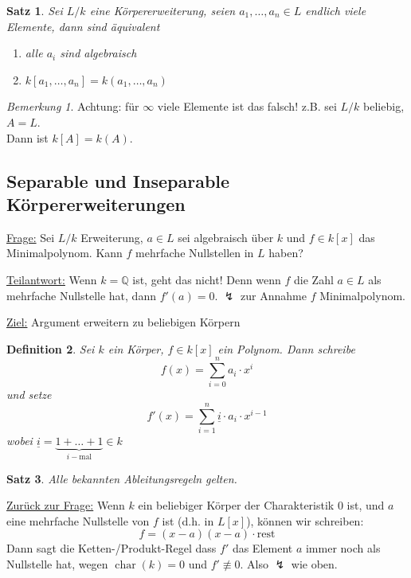 \documentclass[a4paper,12pt,numbers=noenddot,parskip=full]{scrartcl}
\newcommand{\setQ}{\mathbb{Q}}
\newcommand{\heading}{\underline}
\theoremstyle{dotless}
\newtheorem{theorem}{Satz}[section]
\newtheorem{definition}[theorem]{Definition}
\theoremstyle{remark}
\newtheorem*{remark}{Bemerkung}
\begin{document}
	\begin{theorem}
		Sei $L/k$ eine Körpererweiterung, seien $a_1, \dots, a_n \in L$ endlich viele Elemente, dann sind äquivalent
		\begin{enumerate}
			\item alle $a_i$ sind algebraisch
			\item $k[a_1, \dots, a_n] = k(a_1, \dots, a_n)$
		\end{enumerate}
	\end{theorem}

	\begin{remark}
		Achtung: für $\infty$ viele Elemente ist das falsch! z.B. sei $L/k$ beliebig, $A = L$. \\Dann ist $k[A] = k(A)$.
	\end{remark}

	\subsection{Separable und Inseparable Körpererweiterungen}
	
	\heading{Frage:} Sei $L/k$ Erweiterung, $a \in L$ sei algebraisch über $k$ und $f \in k[x]$ das Minimalpolynom. Kann $f$ mehrfache Nullstellen in $L$ haben?
	
	\heading{Teilantwort:} Wenn $k = \setQ$ ist, geht das nicht! Denn wenn $f$ die Zahl $a \in L$ als mehrfache Nullstelle hat, dann $f'(a) = 0$. $\lightning$ zur Annahme $f$ Minimalpolynom.
	
	\heading{Ziel:} Argument erweitern zu beliebigen Körpern
	
	\begin{definition}
		Sei $k$ ein Körper, $f \in k[x]$ ein Polynom. Dann schreibe
		\begin{equation*}
			f(x) = \sum_{i = 0}^n a_i \cdot x^i
		\end{equation*}
		und setze
		\begin{equation*}
			f'(x) = \sum_{i = 1}^n \underline{i} \cdot a_i \cdot x^{i-1}
		\end{equation*}
		wobei $\underline{i} = \underbrace{1 + \dots + 1}_{i-\text{mal}} \in k$
	\end{definition}

	\begin{theorem}
		Alle bekannten Ableitungsregeln gelten.
	\end{theorem}

	\heading{Zurück zur Frage:} Wenn $k$ ein beliebiger Körper der Charakteristik $0$ ist, und $a$ eine mehrfache Nullstelle von $f$ ist (d.h. in $L[x]$), können wir schreiben:
	\begin{equation*}
		f = (x-a)(x-a) \cdot \text{rest}
	\end{equation*}
	Dann sagt die Ketten-/Produkt-Regel dass $f'$ das Element $a$ immer noch als Nullstelle hat, wegen $\operatorname{char}(k) = 0$ und $f' \not\equiv 0$. Also $\lightning$ wie oben.
	
\end{document}
